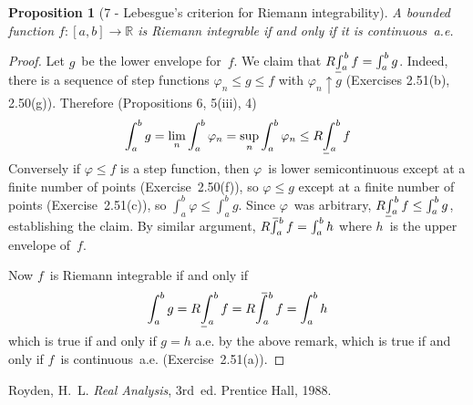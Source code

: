 \documentclass[letterpaper,12pt]{article}
\newcommand{\R}{\mathbb{R}}
\newcommand{\upto}{\uparrow}
\newcommand{\doupperint}[2]{\smash{\int\limits^{\underline{\phantom{x}}}}\mathop{\vphantom{\int}}\nolimits_{\!\!\!\!{#1}}^{\!{#2}}}
\newcommand{\dolowerint}[2]{\smash{\int\limits_{\overline{\phantom{x}}}}\mathop{\vphantom{\int}}\nolimits_{\!\!\!\!{#1}}^{\!{#2}}}
\newcommand{\upperint}[2]{\mathchoice{\doupperint{#1}{#2}}{\doupperint{\;#1}{#2}}{}{}}
\newcommand{\lowerint}[2]{\mathchoice{\dolowerint{#1}{#2}}{\dolowerint{\;#1}{#2}}{}{}}
\newcommand{\Rupperint}[2]{R\upperint{#1}{#2}}
\newcommand{\Rlowerint}[2]{R\lowerint{#1}{#2}}
\theoremstyle{plain}
\newtheorem*{prop}{Proposition}
\theoremstyle{definition}
\theoremstyle{remark}
\begin{document}
\begin{prop}[7 - Lebesgue's criterion for Riemann integrability]
A bounded function \(f:[a,b]\to\R\) is Riemann integrable if and only if it is continuous~a.e.
\end{prop}
\begin{proof}
Let \(g\)~be the lower envelope for~\(f\). We claim that \(\Rlowerint{a}{b}f=\int_a^b g\). Indeed, there is a sequence of step functions \(\varphi_n\le g\le f\) with \(\varphi_n\upto g\) (Exercises 2.51(b), 2.50(g)). Therefore (Propositions 6, 5(iii), 4)
\[\int_a^b g=\lim_n\int_a^b\varphi_n=\sup_n\int_a^b\varphi_n\le\Rlowerint{a}{b}f\]
Conversely if \(\varphi\le f\) is a step function, then \(\varphi\)~is lower semicontinuous except at a finite number of points (Exercise~2.50(f)), so \(\varphi\le g\) except at a finite number of points (Exercise~2.51(c)), so \(\int_a^b\varphi\le\int_a^b g\). Since \(\varphi\)~was arbitrary, \(\Rlowerint{a}{b}f\le\int_a^b g\), establishing the claim. By similar argument, \(\Rupperint{a}{b}f=\int_a^b h\) where \(h\)~is the upper envelope of~\(f\).

Now \(f\)~is Riemann integrable if and only if
\[\int_a^b g=\Rlowerint{a}{b}f=\Rupperint{a}{b}f=\int_a^b h\]
which is true if and only if \(g=h\) a.e. by the above remark, which is true if and only if \(f\)~is continuous~a.e. (Exercise~2.51(a)).
\end{proof}

\begin{thebibliography}{0}
 Royden, H.~L. \textit{Real Analysis}, 3rd~ed. Prentice Hall, 1988.
\end{thebibliography}
\end{document}
